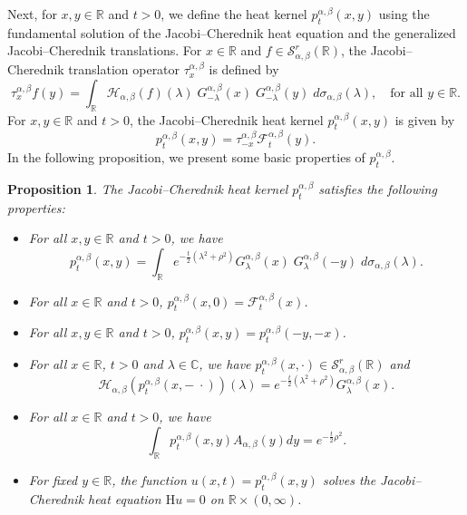 \documentclass[a4paper,11pt, reqno]{amsart}
\theoremstyle{plain}
\newtheorem{proposition}[theorem]{Proposition}
\theoremstyle{definition}
\theoremstyle{remark}
\def \R{{\mathbb R}}
\def\R{\mathbb R}
\def \S{{\mathcal S}}
\def \H{{\mathcal H}}
\begin{document}
Next, for $x, y \in \R$ and $t>0$, we define the heat kernel $p_t^{\alpha, \beta}(x, y)$ using the fundamental solution of the Jacobi--Cherednik heat equation and the generalized Jacobi--Cherednik translations. For $x \in \R$ and $f \in \S^r_{\alpha, \beta} (\mathbb{R})$, the Jacobi--Cherednik translation operator $\tau^{\alpha, \beta}_x$ is defined by
\begin{equation}\label{eq09}
\tau^{\alpha, \beta}_x f(y) = \int_{\mathbb{R}} \H_{\alpha, \beta} (f) (\lambda) \; G^{\alpha, \beta}_{-\lambda}(x) \; G^{\alpha, \beta}_{-\lambda}(y) \;  d\sigma_{\alpha, \beta}(\lambda), \quad \text{for all } y \in \R.
\end{equation}
For $x, y \in \R$ and $t>0$, the Jacobi--Cherednik heat kernel $p_t^{\alpha, \beta}(x, y)$ is given by
\begin{equation}\label{eq1}
p_t^{\alpha, \beta}(x, y) =  \tau^{\alpha, \beta}_{-x} \mathcal{F}_t^{\alpha, \beta}(y).
\end{equation}
In the following proposition, we present some basic properties of $p_t^{\alpha,\beta}$.
\begin{proposition}\label{pro3}
The Jacobi--Cherednik heat kernel $p_t^{\alpha, \beta}$ satisfies the following properties:
\begin{itemize}
\item[(a)] For all $x, y \in \R$ and $t>0$, we have
\begin{equation}\label{eq3}
p_t^{\alpha, \beta}(x, y)= \int_{\mathbb{R}} e^{-\frac{t}{2}\left( \lambda^2+\rho^2\right)}  G^{\alpha, \beta}_\lambda(x)\;  G^{\alpha, \beta}_\lambda(-y) \; d\sigma_{\alpha, \beta}(\lambda).
\end{equation}

\item[(b)] For all $x \in \R$ and $t>0$, $p_t^{\alpha, \beta}(x, 0) = \mathcal{F}_t^{\alpha, \beta}(x)$. 

\item[(c)] For all $x, y \in \R$ and $t>0$, $p_t^{\alpha, \beta}(x, y)=p_t^{\alpha, \beta}(-y, -x)$.

\item[(d)] For all $x \in \R$, $t>0$ and $\lambda \in \mathbb{C}$, we have $p_t^{\alpha, \beta}(x, \cdot) \in \S^r_{\alpha, \beta} (\mathbb{R})$ and 
\[ \H_{\alpha, \beta} \left( p_t^{\alpha, \beta}(x, - \; \cdot) \right) (\lambda) = e^{-\frac{t}{2}\left( \lambda^2+\rho^2\right)} G^{\alpha, \beta}_\lambda(x). \] 

\item[(e)] For all $x \in \R$ and $t>0$, we have
\begin{equation}\label{eq4}
\int_{\R} p_t^{\alpha, \beta}(x, y) A_{\alpha, \beta} (y) dy = e^{-\frac{t}{2} \rho^2}.
\end{equation}

\item[(f)] For fixed $y \in \R$, the function $u(x, t) = p_t^{\alpha, \beta}(x, y)$ solves the Jacobi--Cherednik heat equation $\mathrm{H} u=0$ on $\R \times (0, \infty)$.
\end{itemize}
\end{proposition}
\end{document}
